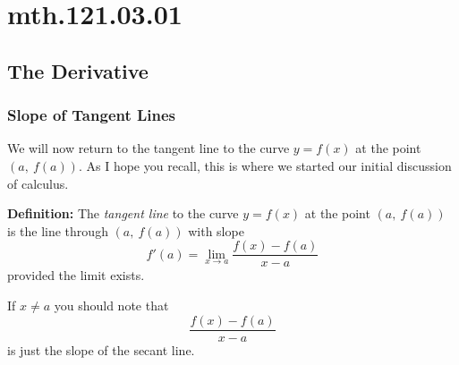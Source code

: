 \documentclass[12pt,addpoints, answers, fleqn]{exam}
\begin{document}
\begin{teacher}
\begin{questions}
\end{questions}
\end{teacher}
\vfill
\pagebreak

\section{mth.121.03.01}
\subsection{The Derivative}


\subsubsection{Slope of Tangent Lines}
We will now return to the tangent line to the curve $y = f \left( x \right)$ at the point $\left( a, \ f \left( a \right)\right)$. As I hope you recall, this is where we started our initial discussion of calculus.



\textbf{Definition:} The \emph{tangent line} to the curve $y = f \left( x \right)$ at the point $\left( a, \ f \left( a \right)\right)$ is the line through  $\left( a, \ f \left( a \right)\right)$ with slope
\[
f'\left( a \right) = \mathop {\lim }\limits_{x \to a }  \frac{f \left( x \right) - f \left( a \right)}{x-a}
\]
provided the limit exists.



If $x \neq a$ you should note that
\[
\frac{f \left( x \right) - f \left( a \right)}{x-a}
\]
is just the slope of the secant line.
\end{document}
